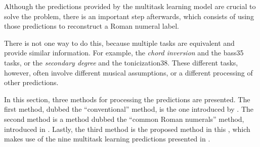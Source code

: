
Although the predictions provided by the multitask learning
model are crucial to solve the problem, there is an
important step afterwards, which consists of using those
predictions to reconstruct a Roman numeral label.

There is not one way to do this, because multiple tasks are
equivalent and provide similar information. For example, the
\emph{chord inversion} and the \gls{bass35} tasks, or the
\emph{secondary degree} and the \gls{tonicization38}. These
different tasks, however, often involve different musical
assumptions, or a different processing of other predictions.

In this section, three methods for processing the
predictions are presented. The first method, dubbed the
``conventional'' method, is the one introduced by
\textcite{chen2018functional}. The second method is a method
dubbed the ``common Roman numerals'' method, introduced in
\textcite{napoleslopez2021augmentednet}. Lastly, the third
method is the proposed method in this \thesisdiss{}, which
makes use of the nine multitask learning predictions
presented in .

